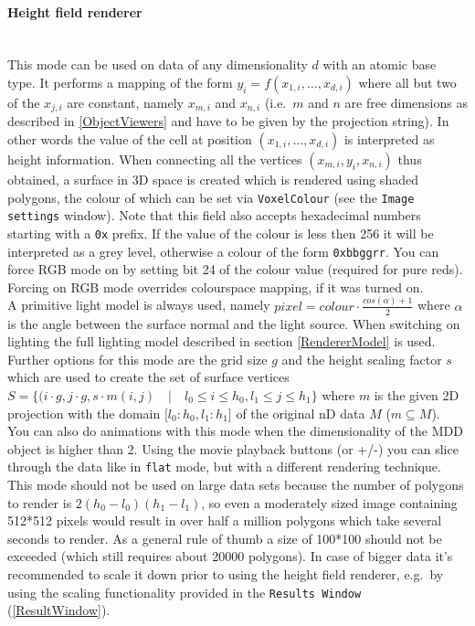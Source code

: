 \documentclass[11pt]{article}
\begin{document}
\paragraph{Height field renderer} \label{HeightFieldRenderer}
\ \\
This mode can be used on data of any dimensionality $d$ with an atomic base type. It
performs a mapping of the form $y_i = f(x_{1,i}, \ldots, x_{d,i})$ where all but two
of the $x_{j,i}$ are constant, namely $x_{m,i}$ and $x_{n,i}$ (i.e.\ $m$ and $n$ are
free dimensions as described in \ref{ObjectViewers} and have to be given by the
projection string). In other words the value of the cell at position
$(x_{1,i}, \ldots, x_{d,i})$ is interpreted as height information.
When connecting all the vertices $(x_{m,i},y_i,x_{n,i})$ 
thus obtained, a surface in 3D space is created which is rendered using shaded
polygons, the colour of which can be set via \texttt{VoxelColour} (see the
\texttt{Image settings} window). Note that this field also accepts hexadecimal
numbers starting with a \texttt{0x} prefix. If the value of the colour is less then
256 it will be interpreted as a grey level, otherwise a colour of the form
\texttt{0xbbggrr}. You can force RGB mode on by setting bit 24 of the colour
value (required for pure reds). Forcing on RGB mode overrides colourspace mapping,
if it was turned on.\\
A primitive light model is always used, namely $pixel = colour \cdot \frac{cos(\alpha)+1}{2}$
where $\alpha$ is the angle between the surface normal and the light source. When
switching on lighting the full lighting model described in section \ref{RendererModel} is used.
Further options for this mode are the grid size $g$ and the height scaling factor $s$
which are used to create the set of surface vertices
$S = \lbrace (i \cdot g, j \cdot g, s \cdot m(i,j) \quad \vert \quad l_0 \le i \le h_0, l_1 \le j \le h_1 \rbrace$
where $m$ is the given 2D projection with the domain $\lbrack l_0:h_0, l_1:h_1 \rbrack$
of the original nD data $M$ ($m \subseteq M$).\\
You can also do animations with this mode when the dimensionality of the MDD object
is higher than 2. Using the movie playback buttons (or +/-) you can slice through the
data like in \texttt{flat} mode, but with a different rendering technique.\\
This mode should not be used on large data sets because the number of polygons to render
is $2 (h_0 - l_0) (h_1 - l_1)$, so even a moderately sized image containing 512*512
pixels would result in over half a million polygons which take several seconds to
render. As a general rule of thumb a size of 100*100 should not be exceeded (which
still requires about 20000 polygons). In case of bigger data it's recommended to scale
it down prior to using the height field renderer, e.g.\ by using the scaling functionality
provided in the \texttt{Results Window} (\ref{ResultWindow}).
\end{document}
